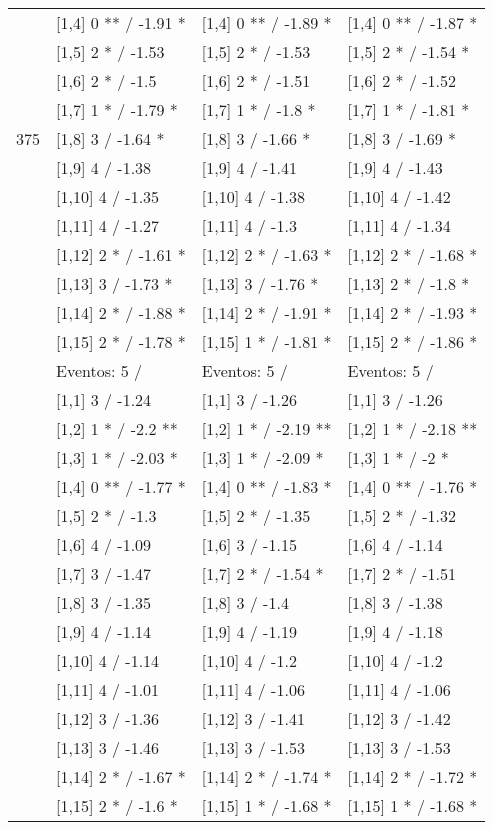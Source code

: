 \begin{table}
\begin{tabular}[t]{llll}
\addlinespace
 & {}[1,4] 0 ** / -1.91 * & {}[1,4] 0 ** / -1.89 * & {}[1,4] 0 ** / -1.87 *\\
 & {}[1,5] 2 * / -1.53 & {}[1,5] 2 * / -1.53 & {}[1,5] 2 * / -1.54 *\\
 & {}[1,6] 2 * / -1.5 & {}[1,6] 2 * / -1.51 & {}[1,6] 2 * / -1.52\\
 & {}[1,7] 1 * / -1.79 * & {}[1,7] 1 * / -1.8 * & {}[1,7] 1 * / -1.81 *\\
375 & {}[1,8] 3  / -1.64 * & {}[1,8] 3  / -1.66 * & {}[1,8] 3  / -1.69 *\\
\addlinespace
 & {}[1,9] 4  / -1.38 & {}[1,9] 4  / -1.41 & {}[1,9] 4  / -1.43\\
 & {}[1,10] 4  / -1.35 & {}[1,10] 4  / -1.38 & {}[1,10] 4  / -1.42\\
 & {}[1,11] 4  / -1.27 & {}[1,11] 4  / -1.3 & {}[1,11] 4  / -1.34\\
 & {}[1,12] 2 * / -1.61 * & {}[1,12] 2 * / -1.63 * & {}[1,12] 2 * / -1.68 *\\
 & {}[1,13] 3  / -1.73 * & {}[1,13] 3  / -1.76 * & {}[1,13] 2 * / -1.8 *\\
\addlinespace
 & {}[1,14] 2 * / -1.88 * & {}[1,14] 2 * / -1.91 * & {}[1,14] 2 * / -1.93 *\\
 & {}[1,15] 2 * / -1.78 * & {}[1,15] 1 * / -1.81 * & {}[1,15] 2 * / -1.86 *\\
 & Eventos:  5 / & Eventos:  5 / & Eventos:  5 /\\
 & {}[1,1] 3  / -1.24 & {}[1,1] 3  / -1.26 & {}[1,1] 3  / -1.26\\
 & {}[1,2] 1 * / -2.2 ** & {}[1,2] 1 * / -2.19 ** & {}[1,2] 1 * / -2.18 **\\
\addlinespace
 & {}[1,3] 1 * / -2.03 * & {}[1,3] 1 * / -2.09 * & {}[1,3] 1 * / -2 *\\
 & {}[1,4] 0 ** / -1.77 * & {}[1,4] 0 ** / -1.83 * & {}[1,4] 0 ** / -1.76 *\\
 & {}[1,5] 2 * / -1.3 & {}[1,5] 2 * / -1.35 & {}[1,5] 2 * / -1.32\\
 & {}[1,6] 4  / -1.09 & {}[1,6] 3  / -1.15 & {}[1,6] 4  / -1.14\\
 & {}[1,7] 3  / -1.47 & {}[1,7] 2 * / -1.54 * & {}[1,7] 2 * / -1.51\\
\addlinespace
500 & {}[1,8] 3  / -1.35 & {}[1,8] 3  / -1.4 & {}[1,8] 3  / -1.38\\
 & {}[1,9] 4  / -1.14 & {}[1,9] 4  / -1.19 & {}[1,9] 4  / -1.18\\
 & {}[1,10] 4  / -1.14 & {}[1,10] 4  / -1.2 & {}[1,10] 4  / -1.2\\
 & {}[1,11] 4  / -1.01 & {}[1,11] 4  / -1.06 & {}[1,11] 4  / -1.06\\
 & {}[1,12] 3  / -1.36 & {}[1,12] 3  / -1.41 & {}[1,12] 3  / -1.42\\
\addlinespace
 & {}[1,13] 3  / -1.46 & {}[1,13] 3  / -1.53 & {}[1,13] 3  / -1.53\\
 & {}[1,14] 2 * / -1.67 * & {}[1,14] 2 * / -1.74 * & {}[1,14] 2 * / -1.72 *\\
 & {}[1,15] 2 * / -1.6 * & {}[1,15] 1 * / -1.68 * & {}[1,15] 1 * / -1.68 *\\
\bottomrule
\end{tabular}
\end{table}
